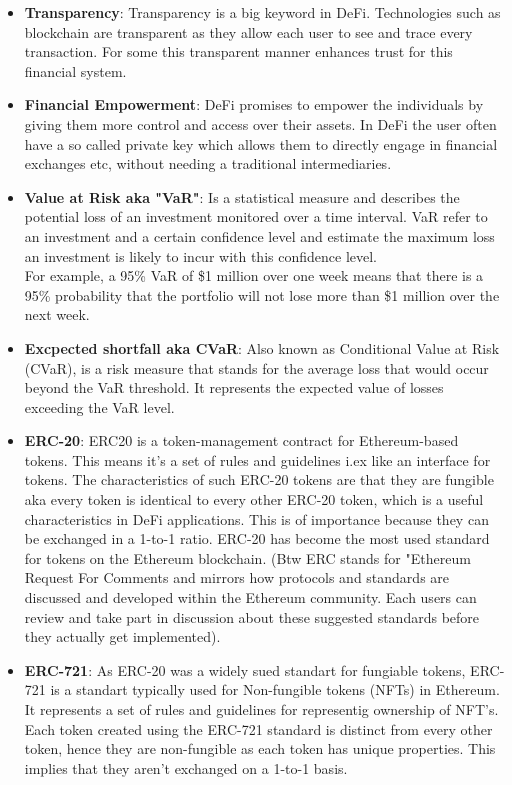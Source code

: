 \documentclass{article}
\begin{document}
\begin{itemize}
    \item \textbf{Transparency}: Transparency is a big keyword in DeFi. Technologies such as blockchain are transparent as they allow each user to see and trace every transaction. For some this transparent manner enhances trust for this financial system.
     \item \textbf{Financial Empowerment}: DeFi promises to empower the individuals by giving them more control and access over their assets. In DeFi the user often have a so called private key which allows them to directly engage in financial exchanges etc, without needing a traditional intermediaries.
      \item \textbf{Value at Risk aka "VaR"}: Is a statistical measure and describes the potential loss of an investment monitored over a time interval. VaR refer to an investment and a certain confidence level and estimate the maximum loss an investment is likely to incur with this confidence level.\\
For example, a 95\% VaR of \$1 million over one week means that there is a 95\% probability that the portfolio will not lose more than \$1 million over the next week.
\item \textbf{Excpected shortfall aka CVaR}:
Also known as Conditional Value at Risk (CVaR), is a risk measure that stands for the average loss that would occur beyond the VaR threshold. It represents the expected value of losses exceeding the VaR level.  
\item \textbf{ERC-20}: ERC20 is a token-management contract for Ethereum-based tokens. This means it's a set of rules and guidelines i.ex like an interface for tokens. The characteristics of such ERC-20 tokens are that they are fungible aka every token is identical to every other ERC-20 token, which is a useful characteristics in DeFi applications. This is of importance because they can be exchanged in a 1-to-1 ratio. ERC-20 has become the most used standard for tokens on the Ethereum blockchain.
(Btw ERC stands for "Ethereum Request For Comments and mirrors how protocols and standards are discussed and developed within the Ethereum community. Each users can review and take part in discussion about these suggested standards before they actually get implemented). 
\item \textbf{ERC-721}: As ERC-20 was a widely sued standart for fungiable tokens, ERC-721 is a standart typically used for Non-fungible tokens (NFTs) in Ethereum. It represents a set of rules and guidelines for representig ownership of NFT's. Each token created using the ERC-721 standard is distinct from every other token, hence they are non-fungible as each token has unique properties. This implies that they aren't exchanged on a 1-to-1 basis.


\end{itemize}
\end{document}
